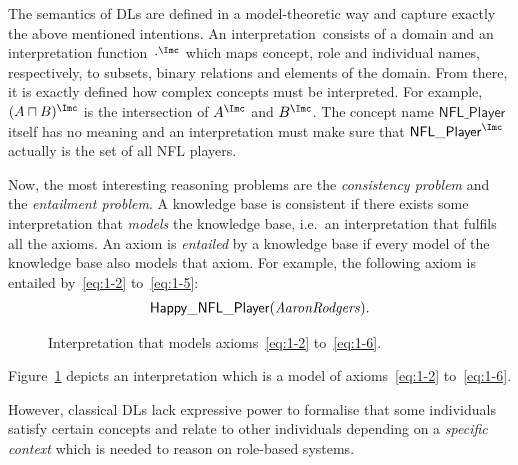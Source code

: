 The semantics of DLs are defined in a model-theoretic way and capture exactly the above mentioned
intentions.  An interpretation~\I consists of a domain and an interpretation function~$\cdot^{\I}$
which maps concept, role and individual names, respectively, to subsets, binary relations and elements of the
domain.  From there, it is exactly defined how complex concepts must be
interpreted. For example, $(A\sqcap B)^{\I}$ is the intersection of $A^{\I}$ and $B^{\I}$.  The
concept name $\mathsf{NFL\_Player}$ itself has no meaning and an interpretation must make sure that
$\mathsf{NFL\_Player}^{\I}$ actually is the set of all NFL players.

Now, the most interesting reasoning problems are the \emph{consistency problem} and the \emph{entailment
problem}. A knowledge base is consistent if there exists some interpretation that \emph{models} the
knowledge base, i.e.\ an interpretation that fulfils all the axioms. An axiom is \emph{entailed} by
a knowledge base if every model of the knowledge base also models that axiom. For example, the following axiom is
entailed by~\eqref{eq:1-2} to~\eqref{eq:1-5}:
\begin{gather}
  \mathsf{Happy\_NFL\_Player}(\text{\textit{AaronRodgers}}).\label{eq:1-6}
\end{gather}


\begin{figure}
  \centering
  \caption{Interpretation that models axioms~\eqref{eq:1-2} to~\eqref{eq:1-6}.}
  \label{fig:dl-example-intro}
\end{figure}

\noindent
Figure~\ref{fig:dl-example-intro} depicts an interpretation which is a model of axioms~\eqref{eq:1-2} to~\eqref{eq:1-6}.

However, classical DLs lack expressive power to formalise that some individuals satisfy certain
concepts and relate to other individuals depending on a \emph{specific context} which is needed to
reason on role-based systems.

